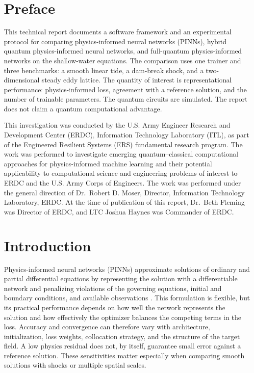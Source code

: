 \documentclass{erdc}
\begin{document}
\maketitle

\tableofcontents

\listoffiguresandtables

\chapter{Preface}
This technical report documents a software framework and an experimental
protocol for comparing physics-informed neural networks (PINNs), hybrid
quantum physics-informed neural networks, and full-quantum
physics-informed networks on the shallow-water equations. The
comparison uses one trainer and three benchmarks: a smooth linear tide,
a dam-break shock, and a two-dimensional steady eddy lattice. The quantity of interest is
representational performance: physics-informed loss, agreement with a
reference solution, and the number of trainable parameters. The quantum
circuits are simulated. The report does not claim a quantum
computational advantage.

This investigation was conducted by the U.S. Army Engineer Research and
Development Center (ERDC), Information Technology Laboratory (ITL), as
part of the Engineered Resilient Systems (ERS) fundamental research
program. The work was performed to investigate emerging
quantum--classical computational approaches for physics-informed
machine learning and their potential applicability to computational
science and engineering problems of interest to ERDC and the U.S. Army
Corps of Engineers. The work was performed under the general direction
of Dr.~Robert D. Moser, Director, Information Technology Laboratory,
ERDC. At the time of publication of this report, Dr.~Beth Fleming was
Director of ERDC, and LTC Joshua Haynes was Commander of ERDC.

\mainmatter

\chapter{Introduction}
\label{sec:introduction}

Physics-informed neural networks (PINNs) approximate solutions of ordinary
and partial differential equations by representing the solution with a
differentiable network and penalizing violations of the governing
equations, initial and boundary conditions, and available observations
\cite{Raissi2019}. This formulation is flexible, but its practical
performance depends on how well the network represents the solution and
how effectively the optimizer balances the competing terms in the loss.
Accuracy and convergence can therefore vary with architecture,
initialization, loss weights, collocation strategy, and the structure of
the target field. A low physics residual does not, by itself, guarantee
small error against a reference solution. These sensitivities matter
especially when comparing smooth solutions with shocks or multiple
spatial scales.
\end{document}
